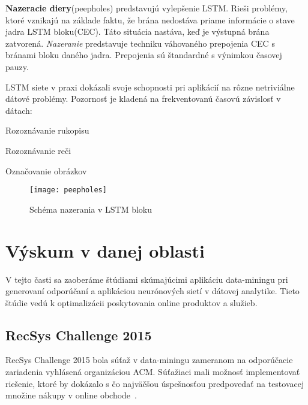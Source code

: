 \textbf{Nazeracie diery}(peepholes) predstavujú vylepšenie LSTM. Rieši problémy, ktoré vznikajú na základe faktu, že brána nedostáva priame informácie o stave jadra LSTM bloku(CEC). Táto situácia nastáva, keď je výstupná brána zatvorená. \textit{Nazeranie} predstavuje techniku váhovaného prepojenia CEC s bránami bloku daného jadra. Prepojenia sú štandardné s výnimkou časovej pauzy.

LSTM siete v praxi dokázali svoje schopnosti pri aplikácií na rôzne netriviálne dátové problémy. Pozornosť je kladená na frekventovanú časovú závislosť v dátach:
\begin{my_itemize}
	\item{Rozoznávanie rukopisu} ~\cite{greff2015lstm}
	\item{Rozoznávanie reči} ~\cite{graves2013speech}
	\item{Označovanie obrázkov} ~\cite{kiros2014unifying}
\end{my_itemize}


\begin{figure}[H]
\begin{center}
\texttt{[image: peepholes]}\end{center}
\caption[peepholes]{Schéma nazerania v LSTM bloku~\cite{gers2003learning}}
\label{fig:lstm}
\end{figure}

\chapter{Výskum v danej oblasti}
\label{analyza_vyskum_danej_oblasti}

V tejto časti sa zaoberáme štúdiami skúmajúcimi aplikáciu data-miningu pri generovaní odporúčaní a aplikáciou neurónových sietí v dátovej analytike. Tieto štúdie vedú k optimalizácii poskytovania online produktov a služieb.

\section{RecSys Challenge 2015}
\label{recsys_challenge}

RecSys Challenge 2015 bola súťaž v data-miningu zameranom na odporúčacie zariadenia vyhlásená organizáciou ACM. Súťažiaci mali možnosť implementovať riešenie, ktoré by dokázalo s čo najväčšou úspešnosťou predpovedať na testovacej množine nákupy v online obchode~\cite{ben2015recsys}.

